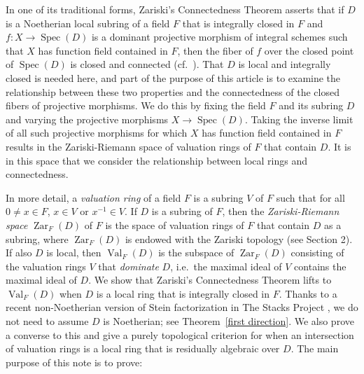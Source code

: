 \documentclass[preprint, 11pt,nonatbib]{elsarticle}
\DeclareMathOperator{\Dom}{Val}
\DeclareMathOperator{\Spec}{Spec}
\DeclareMathOperator{\Zar}{Zar}
\theoremstyle{definition}
\numberwithin{theorem}{section}
\begin{document}
In one of its traditional forms, Zariski's Connectedness Theorem asserts that 
if 
$D$ is a Noetherian local
 subring of a field $F$ that is integrally closed in $F$  
and $f:X \rightarrow \Spec(D)$ is a dominant projective morphism of  integral schemes such that $X$ has
 function field contained in  $F$, then  the fiber of $f$ over the closed point of $\Spec(D)$ is closed and connected (cf.~\cite[Corollary~11.3, p.~279]{MR0463157}). 
 That $D$ is local and integrally closed is needed here, and part of the purpose of this article is to examine the relationship between these two properties and the connectedness of the closed fibers of projective morphisms. We do this by fixing the field $F$ and its subring $D$ and varying the projective morphisms $X \rightarrow \Spec(D)$.   
Taking the inverse limit of all such projective morphisms   for which $X$ has function field contained in $F$ results in the Zariski-Riemann space of valuation rings of $F$ that contain $D$. It is in this space that we consider the relationship between local rings and connectedness. 
 




In more detail,
a {\it valuation ring}  of a field $F$ is a subring $V$ of $F$ such that for all $0 \ne x \in F$, $x \in V$ or $x^{-1} \in V$. 
If $D$ is a subring of $F$, then 
 the {\it Zariski-Riemann space} $\Zar_F(D)$ of $F$ is the space of valuation rings of $F$ that contain $D$ as a subring, where $\Zar_F(D)$ is endowed with the Zariski topology (see Section 2). If also $D$ is local, then $\Dom_F(D)$ is the subspace  of $\Zar_F(D)$ consisting of the valuation rings $V$    that {\it dominate} $D$, i.e.\ the maximal ideal of $V$ contains the maximal ideal of $D$. We show that Zariski's Connectedness Theorem lifts to $\Dom_F(D)$ when $D$ is a local ring that is integrally closed in $F$. Thanks to a recent non-Noetherian version of Stein factorization in The Stacks Project \cite[{Tag~03H2}]{stacks-project}, we do not need to assume $D$ is Noetherian; see Theorem~\ref{first direction}.  
 We also prove a converse to this and give a purely topological criterion for when an intersection of valuation rings is a local ring that is  residually algebraic over $D$. The main purpose of this note is to prove:
\end{document}
